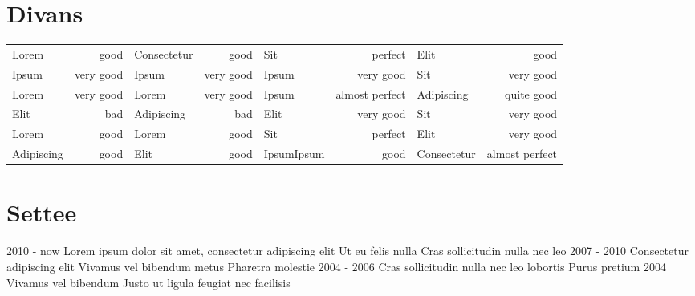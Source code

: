 \documentclass[]{viccuad-cv}
\begin{document}
\framebreak


\section{Divans}
\providecommand{\tabularnewline}{\\}
\setlength{\tabcolsep}{5pt}
    \begin{tabularx}{\linewidth}{X r | X r | X r | X r}
       Lorem       &  good & Consectetur       &  good & Sit      &  perfect &  Elit   &  good\tabularnewline
       Ipsum    &  very good & Ipsum    &  very good & Ipsum      &  very good & Sit            &  very good\tabularnewline
       Lorem     &  very good & Lorem     &  very good & Ipsum      &  almost perfect & Adipiscing               &  quite good\tabularnewline
       Elit  &  bad & Adipiscing  &  bad & Elit     &  very good & Sit       &  very good\tabularnewline
       Lorem &  good & Lorem &  good & Sit         &  perfect & Elit          &  very good\tabularnewline
       Adipiscing  &  good & Elit &  good & IpsumIpsum &  good & Consectetur                  &  almost perfect\tabularnewline
    \end{tabularx}

\framebreak



\section{Settee}
    \begin{entrylistdated}
      \entrydated
        {2010 - now}
        {Lorem ipsum dolor sit amet, consectetur adipiscing elit}
        {Ut eu felis nulla}
        {Cras sollicitudin nulla nec leo}
      \entrydated
        {2007 - 2010}
        {Consectetur adipiscing elit}
        {Vivamus vel bibendum metus}
        {Pharetra molestie}
      \entrydated
        {2004 - 2006}
        {Cras sollicitudin nulla nec leo lobortis}
        {}
        {Purus pretium} 
      \entrydated
        {2004}
        {Vivamus vel bibendum}
        {Justo ut ligula feugiat nec facilisis}
        {}
    \end{entrylistdated}
\end{document}
